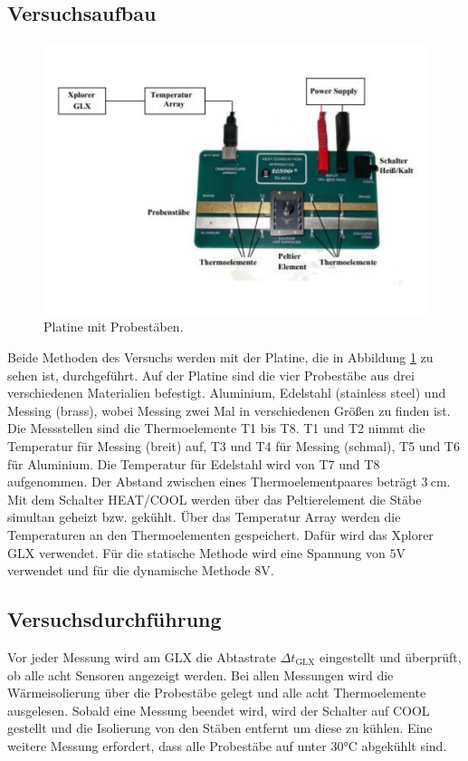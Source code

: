 \subsection{Versuchsaufbau}
\label{subsec:Versuchsaufbau}
\begin{figure}
    \centering
    \includegraphics[width=\textwidth]{platine.pdf}
    \caption{Platine mit Probestäben.\cite{anleitung}}
    \label{fig:platine}
\end{figure}
Beide Methoden des Versuchs werden mit der Platine, die in Abbildung \ref{fig:platine} zu sehen ist, durchgeführt.
Auf der Platine sind die vier Probestäbe aus drei verschiedenen Materialien befestigt.
Aluminium, Edelstahl (stainless steel) und Messing (brass), wobei Messing zwei Mal in verschiedenen Größen zu finden ist.
Die Messstellen sind die Thermoelemente T1 bis T8.
T1 und T2 nimmt die Temperatur für Messing (breit) auf, T3 und T4 für Messing (schmal), T5 und T6 für Aluminium.
Die Temperatur für Edelstahl wird von T7 und T8 aufgenommen.
Der Abstand zwischen eines Thermoelementpaares beträgt $\SI{3}{\centi\metre}$.
Mit dem Schalter HEAT/COOL werden über das Peltierelement die Stäbe simultan geheizt bzw. gekühlt.
Über das Temperatur Array werden die Temperaturen an den Thermoelementen gespeichert.
Dafür wird das Xplorer GLX verwendet.
Für die statische Methode wird eine Spannung von $5\si{\volt}$ verwendet und für die dynamische Methode $8\si{\volt}$.

\subsection{Versuchsdurchführung}
\label{subsec:Versuchsdurchführung}
Vor jeder Messung wird am GLX die Abtastrate $\Delta t_\text{GLX}$ eingestellt und überprüft, ob alle acht Sensoren angezeigt werden.
Bei allen Messungen wird die Wärmeisolierung über die Probestäbe gelegt und alle acht Thermoelemente ausgelesen.
Sobald eine Messung beendet wird, wird der Schalter auf COOL gestellt und die Isolierung von den Stäben entfernt um diese zu kühlen.
Eine weitere Messung erfordert, dass alle Probestäbe auf unter $30\si{\celsius}$ abgekühlt sind.
